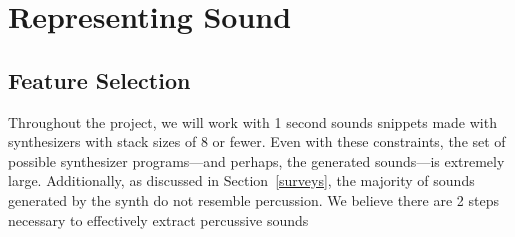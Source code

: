 \documentclass[\main/thesis.tex]{subfiles}
\begin{document}
\chapter{Representing Sound}
\section{Feature Selection}

Throughout the project, we will work with 1 second sounds snippets made with synthesizers with stack sizes of 8 or fewer. Even with these constraints, the set of possible synthesizer programs---and perhaps, the generated sounds---is extremely large. Additionally, as discussed in Section~\ref{surveys}, the majority of sounds generated by the synth do not resemble percussion.  We believe there are 2 steps necessary to effectively extract percussive sounds
\end{document}
